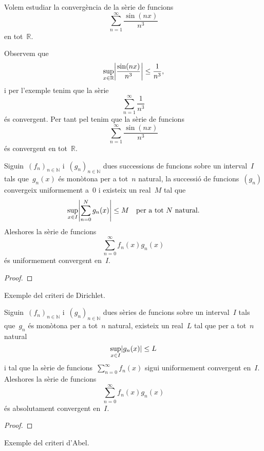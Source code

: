 \documentclass[../../main.tex]{subfiles}
\begin{document}
    \begin{example}
        Volem estudiar la convergència de la sèrie de funcions
        \[
            \sum_{n=1}^{\infty}\frac{\sin(nx)}{n^{3}}
        \]
        en tot~\(\mathbb{R}\).
        \begin{solution}
            Observem que
            \[
                \sup_{x\in\mathbb{R}}\abs{\frac{\sin(nx)}{n^{3}}}\leq\frac{1}{n^{3}},
            \]
            i per l'exemple  tenim que la sèrie
            \[
                \sum_{n=1}^{\infty}\frac{1}{n^{3}}
            \]
            és convergent.
            Per tant pel  tenim que la sèrie de funcions
            \[
                \sum_{n=1}^{\infty}\frac{\sin(nx)}{n^{3}}
            \]
            és convergent en tot~\(\mathbb{R}\).
        \end{solution}
    \end{example}
    \begin{theorem}
        \label{thm:criteri de Dirichlet}
        Siguin~\((f_{n})_{n\in\mathbb{N}}\) i~\((g_{n})_{n\in\mathbb{N}}\) dues successions de funcions sobre un interval~\(I\) tals que~\(g_{n}(x)\) és monòtona per a tot~\(n\) natural, la successió de funcions~\((g_{n})\) convergeix uniformement a~\(0\) i existeix un real~\(M\) tal que
        \[
            \sup_{x\in I}\abs{\sum_{n=0}^{N}g_{n}(x)}\leq M\quad\text{per a tot }N\text{ natural}.
        \]
        Aleshores la sèrie de funcions
        \[
            \sum_{n=0}^{\infty}f_{n}(x)g_{n}(x)
        \]
        és uniformement convergent en~\(I\).
        \begin{proof}
        \end{proof}
    \end{theorem}
    \begin{example}
        Exemple del criteri de Dirichlet.
        \begin{solution}
        \end{solution}
    \end{example}
    \begin{theorem}
        \label{thm:criteri d'Abel}
        Siguin~\((f_{n})_{n\in\mathbb{N}}\) i~\((g_{n})_{n\in\mathbb{N}}\) dues sèries de funcions sobre un interval~\(I\) tals que~\(g_{n}\) és monòtona per a tot~\(n\) natural, existeix un real~\(L\) tal que per a tot~\(n\) natural
        \[
            \sup_{x\in I}\abs{g_{n}(x)}\leq L
        \]
        i tal que la sèrie de funcions~\(\sum_{n=0}^{\infty}f_{n}(x)\) sigui uniformement convergent en~\(I\).
        Aleshores la sèrie de funcions
        \[
            \sum_{n=0}^{\infty}f_{n}(x)g_{n}(x)
        \]
        és absolutament convergent en~\(I\).
        \begin{proof}
        \end{proof}
    \end{theorem}
    \begin{example}
        Exemple del criteri d'Abel.
        \begin{solution}
        \end{solution}
    \end{example}
\end{document}
